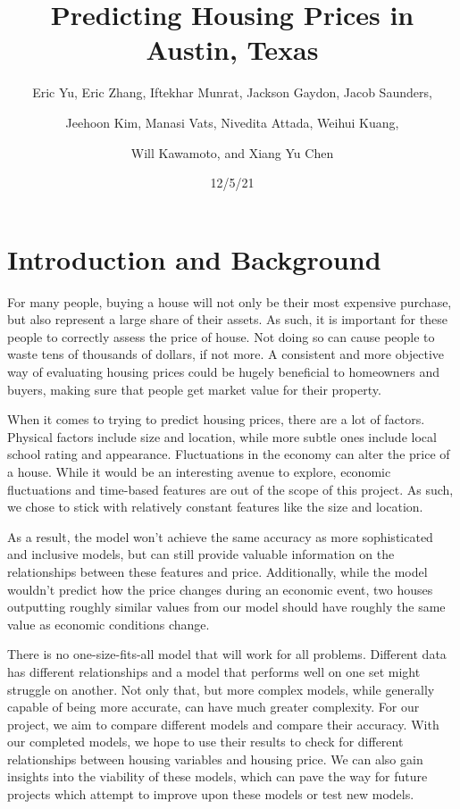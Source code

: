 \documentclass[12pt]{article}
\begin{document}
	\title{Predicting Housing Prices in Austin, Texas}
	\author{\small{Eric Yu, Eric Zhang, Iftekhar Munrat, Jackson Gaydon, Jacob Saunders,} \and \small{Jeehoon Kim, Manasi Vats, Nivedita Attada, Weihui Kuang,} \and \small{Will Kawamoto, and Xiang Yu Chen}}
	\date{12/5/21} 
	\maketitle
	
	\section{Introduction and Background} 
	
	For many people, buying a house will not only be their most expensive purchase, but also represent a large share of their assets. As such, it is important for these people to correctly assess the price of house. Not doing so can cause people to waste tens of thousands of dollars, if not more. A consistent and more objective way of evaluating housing prices could be hugely beneficial to homeowners and buyers, making sure that people get market value for their property.
	
	When it comes to trying to predict housing prices, there are a lot of factors. Physical factors include size and location, while more subtle ones include local school rating and appearance. Fluctuations in the economy can alter the price of a house. While it would be an interesting avenue to explore, economic fluctuations and time-based features are out of the scope of this project. As such, we chose to stick with relatively constant features like the size and location.
	
	As a result, the model won't achieve the same accuracy as more sophisticated and inclusive models, but can still provide valuable information on the relationships between these features and price. Additionally, while the model wouldn’t predict how the price changes during an economic event, two houses outputting roughly similar values from our model should have roughly the same value as economic conditions change. 
	
	There is no one-size-fits-all model that will work for all problems. Different data has different relationships and a model that performs well on one set might struggle on another. Not only that, but more complex models, while generally capable of being more accurate, can have much greater complexity. For our project, we aim to compare different models and compare their accuracy. With our completed models, we hope to use their results to check for different relationships between housing variables and housing price. We can also gain insights into the viability of these models, which can pave the way for future projects which attempt to improve upon these models or test new models.
	
\end{document}
